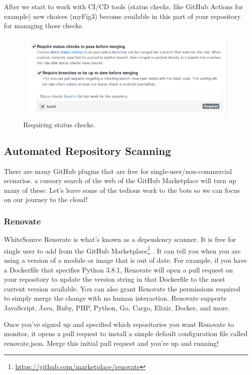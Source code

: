 \justify
After we start to work with CI/CD tools (status checks, like GitHub
Actions for example) new choices ({myFig3}) become available in this
part of your repository for managing those checks.

\begin{figure}
  \includegraphics[scale=0.53]{../images/guthub-status-check.png}
  \caption{Requiring status checks.}
\end{figure}

\subsection{Automated Repository Scanning}

\justify
There are many GitHub plugins that are free for
single-user/non-commercial scenarios. a cursory search of the web of the
GitHub Marketplace will turn up many of these. Let's leave some of the
tedious work to the bots so we can focus on our journey to the cloud!


\subsubsection{Renovate}

WhiteSource Renovate is what's known as a dependency scanner. It is free
for single user to add from the GitHub Marketplace\footnote{\url{https://github.com/marketplace/renovate}}
. It can tell you when you are using a version of a module or image that
is out of date. For example, if you have a Dockerfile that specifies
Python 3.8.1, Renovate will open a pull request on your repository to
update the version string in that Dockerfile to the most current version
available. You can also grant Renovate the permissions required to
simply merge the change with no human interaction. Renovate supports
JavaScript, Java, Ruby, PHP, Python, Go, Cargo, Elixir, Docker, and
more.

\justify
Once you've signed up and specified which repositories you want Renovate
to monitor, it opens a pull request to install a simple default
configuration file called renovate.json. Merge this initial pull request
and you're up and running!

